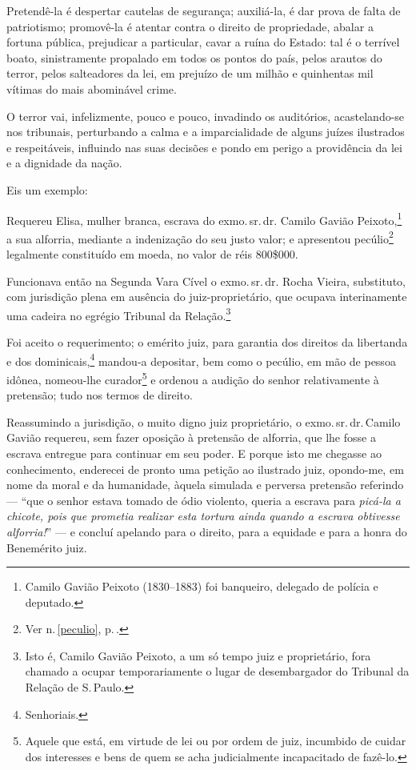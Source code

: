 Pretendê-la é despertar cautelas de segurança; auxiliá-la, é dar prova
de falta de patriotismo; promovê-la é atentar contra o direito de
propriedade, abalar a fortuna pública, prejudicar a particular, cavar a
ruína do Estado: tal é o terrível boato, sinistramente propalado em
todos os pontos do país, pelos arautos do terror, pelos salteadores da
lei, em prejuízo de um milhão e quinhentas mil vítimas do mais
abominável crime.

O terror vai, infelizmente, pouco e pouco, invadindo os auditórios,
acastelando-se nos tribunais, perturbando a calma e a imparcialidade de
alguns juízes ilustrados e respeitáveis, influindo nas suas decisões e
pondo em perigo a providência da lei e a dignidade da nação.

Eis um exemplo:

Requereu Elisa, mulher branca, escrava do exmo.\,sr.\,dr. Camilo Gavião Peixoto,\footnote{Camilo Gavião Peixoto (1830--1883) foi banqueiro,
  delegado de polícia e deputado.} a sua alforria, mediante a
indenização do seu justo valor; e apresentou pecúlio\footnote{
  Ver n.\,\ref{peculio}, p.\,\pageref{peculio}.} legalmente constituído em moeda,
no valor de réis 800\$000.

Funcionava então na Segunda Vara Cível o exmo.\,sr.\,dr. Rocha Vieira,
substituto, com jurisdição plena em ausência do juiz-proprietário, que
ocupava interinamente uma cadeira no egrégio Tribunal da
Relação.\footnote{Isto é, Camilo Gavião Peixoto, a um só tempo juiz e
  proprietário, fora chamado a ocupar temporariamente o lugar de
  desembargador do Tribunal da Relação de S.\,Paulo.}

Foi aceito o requerimento; o emérito juiz, para garantia dos direitos da
libertanda e dos dominicais,\footnote{Senhoriais.} mandou-a depositar,
bem como o pecúlio, em mão de pessoa idônea, nomeou-lhe
curador\footnote{Aquele que está, em virtude de lei ou por ordem de
  juiz, incumbido de cuidar dos interesses e bens de quem se acha
  judicialmente incapacitado de fazê-lo.} e ordenou a audição do senhor
relativamente à pretensão; tudo nos termos de direito.

Reassumindo a jurisdição, o muito digno juiz proprietário, o exmo.\,sr.\,dr.\,Camilo Gavião requereu, sem fazer oposição à pretensão de alforria,
que lhe fosse a escrava entregue para continuar em seu poder. E porque
isto me chegasse ao conhecimento, enderecei de pronto uma petição ao
ilustrado juiz, opondo-me, em nome da moral e da humanidade, àquela
simulada e perversa pretensão referindo --- ``que o senhor estava
tomado de ódio violento, queria a escrava para \emph{picá-la a chicote,
pois que prometia realizar esta tortura ainda quando a escrava obtivesse
alforria!}'' --- e concluí apelando para o direito, para a equidade
e para a honra do Benemérito juiz.

